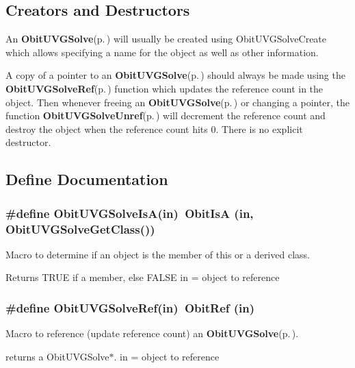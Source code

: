 \subsection{Creators and Destructors}\label{ObitUVGSolve_8h_ObitUVGSolveaccess}
An {\bf Obit\-UVGSolve}{\rm (p.\,\pageref{structObitUVGSolve})} will usually be created using Obit\-UVGSolve\-Create which allows specifying a name for the object as well as other information.

A copy of a pointer to an {\bf Obit\-UVGSolve}{\rm (p.\,\pageref{structObitUVGSolve})} should always be made using the {\bf Obit\-UVGSolve\-Ref}{\rm (p.\,\pageref{ObitUVGSolve_8h_a1})} function which updates the reference count in the object. Then whenever freeing an {\bf Obit\-UVGSolve}{\rm (p.\,\pageref{structObitUVGSolve})} or changing a pointer, the function {\bf Obit\-UVGSolve\-Unref}{\rm (p.\,\pageref{ObitUVGSolve_8h_a0})} will decrement the reference count and destroy the object when the reference count hits 0. There is no explicit destructor.

\subsection{Define Documentation}
\subsubsection{\setlength{\rightskip}{0pt plus 5cm}\#define Obit\-UVGSolve\-Is\-A(in)\ Obit\-Is\-A (in, Obit\-UVGSolve\-Get\-Class())}\label{ObitUVGSolve_8h_a2}


Macro to determine if an object is the member of this or a derived class. 

Returns TRUE if a member, else FALSE in = object to reference 
\subsubsection{\setlength{\rightskip}{0pt plus 5cm}\#define Obit\-UVGSolve\-Ref(in)\ Obit\-Ref (in)}\label{ObitUVGSolve_8h_a1}


Macro to reference (update reference count) an {\bf Obit\-UVGSolve}{\rm (p.\,\pageref{structObitUVGSolve})}. 

returns a Obit\-UVGSolve$\ast$. in = object to reference 
